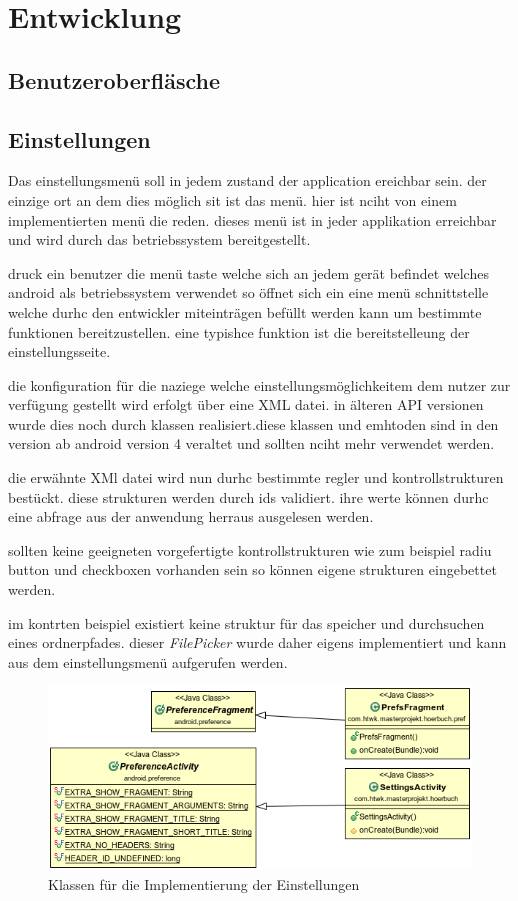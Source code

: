 \section{Entwicklung}
\subsection{Benutzeroberfläsche}
\subsection{Einstellungen}
Das einstellungsmenü soll in jedem zustand der application ereichbar sein. der einzige ort an dem dies möglich sit ist das menü. hier ist nciht von einem implementierten menü die reden. dieses menü ist in jeder applikation erreichbar und wird durch das betriebssystem bereitgestellt.

druck ein benutzer die menü taste welche sich an jedem gerät befindet welches android als betriebssystem verwendet so öffnet sich ein eine menü schnittstelle welche durhc den entwickler miteinträgen befüllt werden kann um bestimmte funktionen bereitzustellen. eine typishce funktion ist die bereitstelleung der einstellungsseite.

die konfiguration für die naziege welche einstellungsmöglichkeitem dem nutzer zur verfügung gestellt wird erfolgt über eine XML datei. in älteren API versionen wurde dies noch durch klassen realisiert.diese klassen und emhtoden sind in den version ab android version 4 veraltet und sollten nciht mehr verwendet werden.

die erwähnte XMl datei wird nun durhc bestimmte regler und kontrollstrukturen bestückt. diese strukturen werden durch ids validiert. ihre werte können durhc eine abfrage aus der anwendung herraus ausgelesen werden.

sollten keine geeigneten vorgefertigte kontrollstrukturen wie zum beispiel radiu button und checkboxen vorhanden sein so können eigene strukturen eingebettet werden.

im kontrten beispiel existiert keine struktur für das speicher und durchsuchen  eines ordnerpfades. dieser \textit{FilePicker} wurde daher eigens implementiert und kann aus dem einstellungsmenü aufgerufen werden.

\begin{center}
\begin{figure}
\includegraphics[scale=0.7]{images/settings}
\caption{Klassen für die Implementierung der Einstellungen}
\label{settings}
\end{figure}
\end{center}

